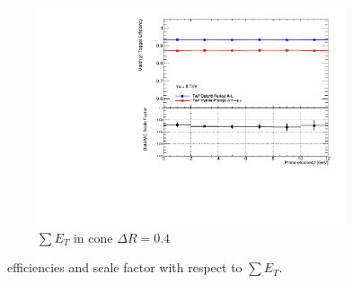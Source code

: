 \begin{figure}[phtb]
    \begin{subfigure}[b]{0.60\textwidth}
      \includegraphics[width=\textwidth]{PartCalibration2012/Plots/SFPlots/etcone40_smt.pdf}
      \caption{$\sum E_{T}$ in cone $\Delta R=0.4$}\label{fig:CalibrationIsoEtcone40}
    \end{subfigure}
  \caption{\xsd\ efficiencies and scale factor with respect to $\sum E_{T}$.} \label{fig:CalibrationIsoEtcone}
\end{figure}

